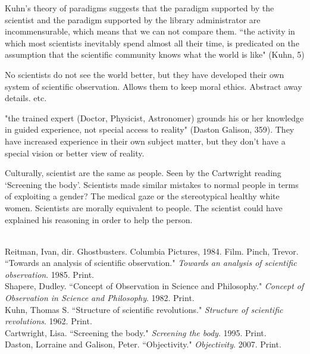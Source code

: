 \documentclass[11pt, oneside]{article}
\begin{document}

\par Kuhn's theory of paradigms suggests that the paradigm supported by the scientist and the paradigm supported by the library administrator are incommensurable, which means that we can not compare them. ``the activity in which most scientists inevitably spend almost all their time, is predicated on the assumption that the scientific community knows what the world is like" (Kuhn, 5)

\par No scientists do not see the world better, but they have developed their own system of scientific observation. Allows them to keep moral ethics. Abstract away details. etc.

\par "the trained expert (Doctor, Physicist, Astronomer) grounds his or her knowledge in guided experience, not special access to reality" (Daston Galison, 359). They have increased experience in their own subject matter, but they don't have a special vision or better view of reality.

\par Culturally, scientist are the same as people. Seen by the Cartwright reading `Screening the body'. Scientists made similar mistakes to normal people in terms of exploiting a gender? The medical gaze or the stereotypical healthy white women. Scientists are morally equivalent to people. The scientist could have explained his reasoning in order to help the person.



\begin{workscited}
\bibent \\
\bibent Reitman, Ivan, dir. Ghostbusters. Columbia Pictures, 1984. Film.
\bibent Pinch, Trevor. ``Towards an analysis of scientific observation."  \textit{Towards an analysis of scientific observation}.  1985. Print. \\
\bibent Shapere, Dudley. ``Concept of Observation in Science and Philosophy."  \textit{Concept of Observation in Science and Philosophy}.  1982. Print. \\
\bibent Kuhn, Thomas S. ``Structure of scientific revolutions."  \textit{Structure of scientific revolutions}.  1962. Print. \\
\bibent Cartwright, Lisa. ``Screening the body."  \textit{Screening the body}.  1995. Print. \\
\bibent Daston, Lorraine and Galison, Peter. ``Objectivity."  \textit{Objectivity}.  2007. Print. \\
\end{workscited}
\end{document}
